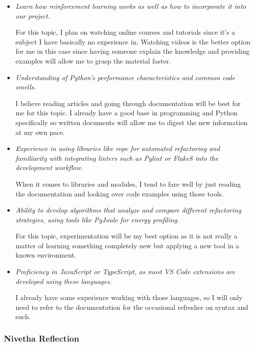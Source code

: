 \documentclass[12pt]{article}
\begin{document}
\begin{itemize}[label={}, wide=0pt, leftmargin=*]

  \item \textit{Learn how reinforcement learning works as well as how
    to incorporate it into our project.}

    For this topic, I plan on watching online courses and tutorials
    since it's a subject I have basically no experience in. Watching
    videos is the better option for me in this case since having
    someone explain the knowledge and providing examples will allow
    me to grasp the material faster.

  \item \textit{Understanding of Python's performance characteristics
    and common code smells.}

    I believe reading articles and going through documentation will
    be best for me for this topic. I already have a good base in
    programming and Python specifically so written documents will
    allow me to digest the new information at my own pace.

  \item \textit{Experience in using libraries like rope for automated
      refactoring and familiarity with integrating linters such as
    Pylint or Flake8 into the development workflow.}

    When it comes to libraries and modules, I tend to fare well by
    just reading the documentation and looking over code examples
    using those tools.

  \item \textit{Ability to develop algorithms that analyze and
      compare different refactoring strategies, using tools like
    PyJoule for energy profiling.}

    For this topic, experimentation will be my best option as it is
    not really a matter of learning something completely new but
    applying a new tool in a known environment.

  \item \textit{Proficiency in JavaScript or TypeScript, as most VS
    Code extensions are developed using these languages.}

    I already have some experience working with those languages, so I
    will only need to refer to the documentation for the occasional
    refresher on syntax and such.

\end{itemize}

\subsubsection*{Nivetha  Reflection}
\medskip
\end{document}
